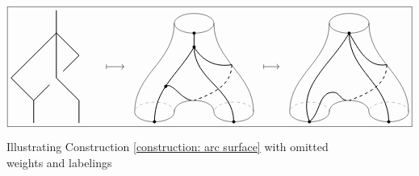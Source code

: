 \documentclass{amsart}
\renewcommand{\1}{\mathbf{1}}
\theoremstyle{definition}
\begin{document}
\begin{figure} 
	\begin{equation*}
	\boxed{
		\begin{tikzpicture}[scale=.8]
		\draw[thick] (1,5)--(1,2)--(2,1)--(2,0);
		\draw[thick] (1,4)--(-1,2)--(0,1)--(0,0);
		\draw[thick] (1,4)--(2,3)--(1.3,2.3);
		\draw[thick] (.7,1.7)--(0,1);
		
		\draw[|->] (3.2,2.5) to (4,2.5);
		\end{tikzpicture}
		\quad
		\begin{tikzpicture}[scale=.7]
		\draw (0,.5) arc (0:180: 1  and 0.5);
		\draw (0,.5) arc (0:-180: 1 and 0.5);
		\draw[dashed,color=gray] (-2,-4) arc (0:180: 1  and 0.5);
		\draw (-2,-4) arc (0:-180: 1 and 0.5);
		\draw[dashed,color=gray] (2,-4) arc (0:180: 1  and 0.5);
		\draw (2,-4) arc (0:-180: 1 and 0.5);
		\filldraw (1,-4.5) circle (2pt);
		\filldraw (-3,-4.5) circle (2pt);
		\filldraw (-1,0) circle (2pt);
		
		\filldraw (-1,-.7) circle (2pt);
		\draw [thick] (-1,-.7)--(-1,0);
		
		\draw  (-2,.5) to [out=-90, in=90] (-4,-4);
		\draw  (0,.5) to [out=-90, in=90] (2,-4);
		\draw  (-2,-4) to [out=90, in=90] (0,-4);
		
		\draw [thick] (-1,-.7) to [out=-120, in=90] (-3,-4.5);
		\draw [thick] (-1,-.7) to [out=-90, in=90] (1,-4.5);
		\draw [thick] (-1,-.7) to [out=-60, in=190] (.9,-1.6);
		\draw [thick, dashed] (.9,-1.6) to [out=-90, in=20] (-1,-3.42);
		\draw [thick] (-2.5,-2.8) to [out=60, in=170] (-1.15,-3.41);
		
		\filldraw (-2.43,-2.7) circle (2pt);
		
		\draw[|->] (2.5,-1.7) to (3.3,-1.7);
		\end{tikzpicture}
		\quad 
		\begin{tikzpicture}[scale=.7]
		\draw (0,.5) arc (0:180: 1  and 0.5);
		\draw (0,.5) arc (0:-180: 1 and 0.5);
		\draw[dashed,color=gray] (-2,-4) arc (0:180: 1  and 0.5);
		\draw (-2,-4) arc (0:-180: 1 and 0.5);
		\draw[dashed,color=gray] (2,-4) arc (0:180: 1  and 0.5);
		\draw (2,-4) arc (0:-180: 1 and 0.5);
		\filldraw (1,-4.5) circle (2pt);
		\filldraw (-3,-4.5) circle (2pt);
		\filldraw (-1,0) circle (2pt);
		
		\draw  (-2,.5) to [out=-90, in=90] (-4,-4);
		\draw  (0,.5) to [out=-90, in=90] (2,-4);
		\draw  (-2,-4) to [out=90, in=90] (0,-4);
		
		\draw [thick] (-1,0) to [out=-120, in=110] (-3,-4.5);
		\draw [thick] (-1,0) to [out=-90, in=90] (1,-4.5);
		\draw [thick] (-1,0) to [out=-60, in=190] (.9,-1.6);
		\draw [thick, dashed] (.9,-1.6) to [out=-90, in=20] (-1,-3.42);
		\draw [thick] (-1.8,-3) to [out=0, in=170] (-1.15,-3.41);
		\draw [thick] (-1.8,-3) to [out=180, in=40] (-3,-4.5);
		\end{tikzpicture}	
	}
	\end{equation*}
	\caption{Illustrating Construction \ref{construction: arc surface} with omitted weights and labelings}
\end{figure}
\end{document}
